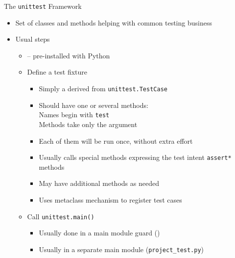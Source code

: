 \begin{frame}{The \texttt{unittest} Framework}
%
\begin{itemize}
\item Set of classes and methods helping with common testing business
\item Usual steps
	\begin{itemize}
	\item {} -- pre-installed with Python
	\item Define a test fixture
		\begin{itemize}
		\item Simply a  derived from \texttt{unittest.TestCase}
		\item Should have one or several methods: \\
				Names begin with \texttt{test} \\
			 	Methods take only the  argument
		\item Each of them will be run once, without extra effort
		\item Usually calls special methods expressing the test intent \Thus \texttt{assert*} methods
		\item May have additional methods as needed
		\item Uses metaclass mechanism to register test cases
		\end{itemize}
	\item Call \texttt{unittest.main()}
		\begin{itemize}
		\item Usually done in a main module guard ()
		\item Usually in a separate main module (\texttt{project\_test.py})
		\end{itemize}
	\end{itemize}
\end{itemize}
%
\end{frame}


